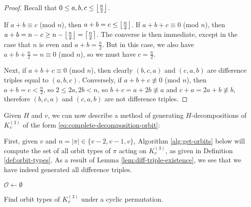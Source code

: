 \begin{proof}
Recall that $0 \leq a, b, c \leq \left\lfloor \frac{n}{2} \right\rfloor$.

If $a + b \equiv c$ (mod $n$), then $a + b = c \leq \left\lfloor \frac{n}{2} \right\rfloor$.
If $a + b + c \equiv 0$ (mod $n$), then $a + b = n-c \geq n-\left\lfloor \frac{n}{2} \right\rfloor = \left\lceil \frac{n}{2} \right\rceil$.
The converse is then immediate, except in the case that $n$ is even and $a + b = \frac{n}{2}$. But in this case, we also have $a + b + \frac{n}{2} = n \equiv 0$ (mod $n$), so we must have $c = \frac{n}{2}$.

Next, if $a + b + c \equiv 0$ (mod $n$), then clearly $(b, c, a)$ and $(c, a, b)$ are difference triples equal to $(a, b, c)$. Conversely, if $a + b + c \not\equiv 0$ (mod $n$), then $a + b = c < \frac{n}{2}$, so $2 \leq 2a, 2b < n$, so $b + c = a + 2b \not\equiv a$ and $c + a = 2a + b \not\equiv b$, therefore $(b, c, a)$ and $(c, a, b)$ are not difference triples.
\end{proof}

Given $H$ and $v$, we can now describe a method of generating $H$-decompositions of $K_{v}^{(3)}$ of the form \eqref{eq:complete-decomposition-orbit}:

First, given $v$ and $n = |\pi| \in \{v-2, v-1, v\}$, Algorithm \ref{alg:get-orbits} below will compute the set of all orbit types of $\pi$ acting on $K_{v}^{(3)}$, as given in Definition \ref{def:orbit-types}.
As a result of Lemma \ref{lem:diff-triple-existence}, we see that we have indeed generated all difference triples.

\begin{algorithm}

$\mathcal{O} \gets \emptyset$\;





\caption{Find orbit types of $K_v^{(3)}$ under a cyclic permutation.} \label{alg:get-orbits}
\end{algorithm}

